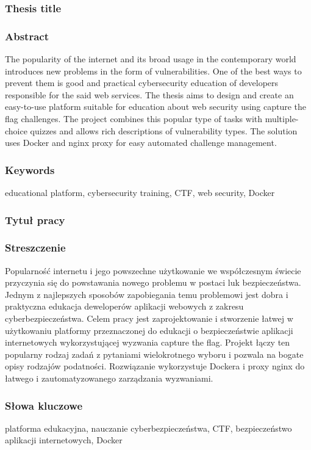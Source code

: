 \subsubsection*{Thesis title} \Title

\subsubsection*{Abstract}
The popularity of the internet and its broad usage in the contemporary world introduces new problems in the form of vulnerabilities. One of the best ways to prevent them is good and practical cybersecurity education of developers responsible for the said web services. The thesis aims to design and create an easy-to-use platform suitable for education about web security using capture the flag challenges. The project combines this popular type of tasks with multiple-choice quizzes and allows rich descriptions of vulnerability types. The solution uses Docker and nginx proxy for easy automated challenge management.

\subsubsection*{Keywords}
educational platform, cybersecurity training, CTF, web security, Docker

\subsubsection*{Tytuł pracy}
\begin{otherlanguage}{polish}
\TitleAlt
\end{otherlanguage}

\subsubsection*{Streszczenie}
\begin{otherlanguage}{polish}
Popularność internetu i jego powszechne użytkowanie we współczesnym świecie przyczynia się do powstawania nowego problemu w postaci luk bezpieczeństwa. Jednym z najlepszych sposobów zapobiegania temu problemowi jest dobra i praktyczna edukacja deweloperów aplikacji webowych z zakresu cyberbezpieczeństwa. Celem pracy jest zaprojektowanie i stworzenie łatwej w użytkowaniu platformy przeznaczonej do edukacji o bezpieczeństwie aplikacji internetowych wykorzystującej wyzwania capture the flag. Projekt łączy ten popularny rodzaj zadań z pytaniami wielokrotnego wyboru i pozwala na bogate opisy rodzajów podatności. Rozwiązanie wykorzystuje Dockera i proxy nginx do łatwego i zautomatyzowanego zarządzania wyzwaniami.
\end{otherlanguage}
\subsubsection*{Słowa kluczowe}
\begin{otherlanguage}{polish}
platforma edukacyjna, nauczanie cyberbezpieczeństwa, CTF, bezpieczeństwo aplikacji internetowych, Docker
\end{otherlanguage}

